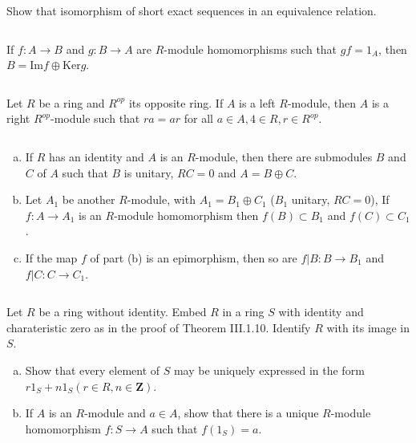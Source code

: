$$ $$

\begin{ex}
    Show that isomorphism of short exact sequences in an equivalence relation.
\end{ex}

$$ $$

\begin{ex}
    If $f:A\to B$ and $g:B\to A$ are $R$-module homomorphisms such that $gf=1_{A}$, then $B=\mathrm{Im}f\oplus \mathrm{Ker}g$.
\end{ex}

$$ $$

\begin{ex}
    Let $R$ be a ring and $R^{op}$ its opposite ring. If $A$ is a left $R$-module, then $A$ is a right $R^{op}$-module such that $ra=ar$ for all $a\in A, 4\in R, r\in R^{op}$.
\end{ex}

$$ $$

\begin{ex}
    \begin{enumerate}[(a)]
        \item If $R$ has an identity and $A$ is an $R$-module, then there are submodules $B$ and $C$ of $A$ such that $B$ is unitary, $RC=0$ and $A=B\oplus C$.
        \item Let $A_{1}$ be another $R$-module, with $A_{1}=B_{1}\oplus C_{1}$ ($B_{1}$ unitary, $RC=0$), If $f:A\to A_{1}$ is an $R$-module homomorphism then $f(B)\subset B_{1}$ and $f(C)\subset C_{1}$.
        \item If the map $f$ of part (b) is an epimorphism, then so are $f|B:B\to B_{1}$ and $f|C:C\to C_{1}$.
    \end{enumerate}
\end{ex}

$$ $$

\begin{ex}
    Let $R$ be a ring without identity. Embed $R$ in a ring $S$ with identity and charateristic zero as in the proof of Theorem III.1.10. Identify $R$ with its image in $S$.
    \begin{enumerate}[(a)]
        \item Show that every element of $S$ may be uniquely expressed in the form $r1_{S}+n1_{S}(r\in R, n\in \mathbf{Z})$.
        \item If $A$ is an $R$-module and $a\in A$, show that there is a unique $R$-module homomorphism $f:S\to A$ such that $f(1_{S})=a$.
    \end{enumerate}
\end{ex}